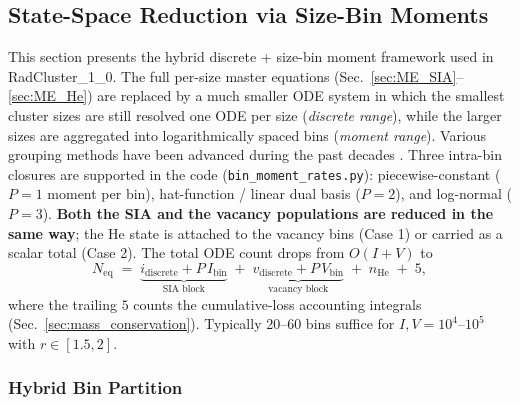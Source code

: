 \subsection{State-Space Reduction via Size-Bin Moments}
\label{sec:size_bin_moments}

This section presents the hybrid discrete + size-bin moment framework
used in RadCluster\_1\_0. The full per-size master equations
(Sec.~\ref{sec:ME_SIA}--\ref{sec:ME_He}) are replaced by a much
smaller ODE system in which the smallest cluster sizes are still
resolved one ODE per size (\emph{discrete range}), while the larger
sizes are aggregated into logarithmically spaced bins
(\emph{moment range}). Various grouping methods have been advanced
during the past decades
\cite{Kiritani1973,Koiwa1974,Hayns1976,Ghoniem1988BiasFactor,
HuangGhoniem1995,Golubov2001Grouping,Ovcharenko2003}. Three intra-bin
closures are supported in the code (\texttt{bin\_moment\_rates.py}):
piecewise-constant ($P=1$ moment per bin), hat-function / linear
dual basis ($P=2$), and log-normal ($P=3$). \textbf{Both the SIA and
the vacancy populations are reduced in the same way}; the He state is
attached to the vacancy bins (Case 1) or carried as a scalar total
(Case 2). The total ODE count drops from $O(I+V)$ to
\begin{equation}\label{eq:Neq_bin}
    N_{\mathrm{eq}}
    \;=\; \underbrace{i_{\mathrm{discrete}} + P\,I_{\mathrm{bin}}}_{\text{SIA block}}
    \;+\; \underbrace{v_{\mathrm{discrete}} + P\,V_{\mathrm{bin}}}_{\text{vacancy block}}
    \;+\; n_{\mathrm{He}}
    \;+\; 5,
\end{equation}
where the trailing $5$ counts the cumulative-loss accounting integrals
(Sec.~\ref{sec:mass_conservation}). Typically 20--60 bins suffice for
$I, V = 10^4\text{--}10^5$ with $r \in [1.5, 2]$.

\subsubsection*{Hybrid Bin Partition}
\label{sec:log_bins}

